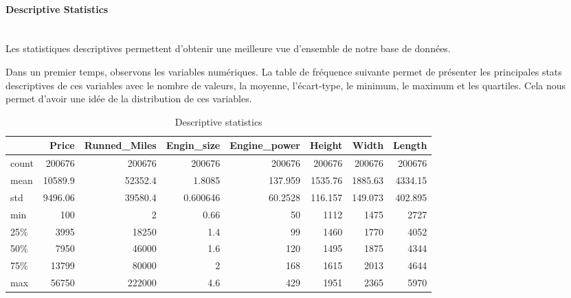 \documentclass[12pt]{article}
\begin{document}
\paragraph{Descriptive Statistics}
~~\\

\noindent Les statistiques descriptives permettent d'obtenir une meilleure vue d'ensemble de notre base de données. 

\noindent Dans un premier temps, observons les variables numériques. La table de fréquence suivante permet de présenter les principales stats descriptives de ces variables avec le nombre de valeurs, la moyenne, l'écart-type, le minimum, le maximum et les quartiles. Cela nous permet d'avoir une idée de la distribution de ces variables.

\begin{table}[h]
    \centering
    \caption{ Descriptive statistics}
    \begin{tabular}{lrrrrrrr}
    \toprule
           & Price & Runned\_Miles & Engin\_size & Engine\_power & Height & Width & Length \\
    \midrule
     count & 200676 & 200676 & 200676 & 200676 & 200676 & 200676 & 200676 \\
     mean & 10589.9 & 52352.4 & 1.8085 & 137.959 & 1535.76 & 1885.63 & 4334.15 \\
     std & 9496.06 & 39580.4 & 0.600646 & 60.2528 & 116.157 & 149.073 & 402.895 \\
     min & 100 & 2 & 0.66 & 50 & 1112 & 1475 & 2727 \\
     25\% & 3995 & 18250 & 1.4 & 99 & 1460 & 1770 & 4052 \\
     50\% & 7950 & 46000 & 1.6 & 120 & 1495 & 1875 & 4344 \\
     75\% & 13799 & 80000 & 2 & 168 & 1615 & 2013 & 4644 \\
     max & 56750 & 222000 & 4.6 & 429 & 1951 & 2365 & 5970 \\
    \bottomrule
    \end{tabular}
\end{table}
\end{document}
